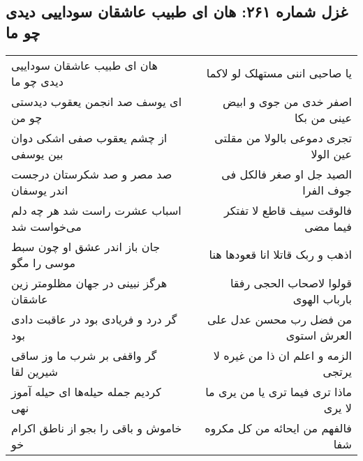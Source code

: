 \begin{center}
\section*{غزل شماره ۲۶۱: هان ای طبیب عاشقان سوداییی دیدی چو ما}
\label{sec:0261}
\begin{longtable}{l p{0.5cm} r}
هان ای طبیب عاشقان سوداییی دیدی چو ما
&&
یا صاحبی اننی مستهلک لو لاکما
\\
ای یوسف صد انجمن یعقوب دیدستی چو من
&&
اصفر خدی من جوی و ابیض عینی من بکا
\\
از چشم یعقوب صفی اشکی دوان بین یوسفی
&&
تجری دموعی بالولا من مقلتی عین الولا
\\
صد مصر و صد شکرستان درجست اندر یوسفان
&&
الصید جل او صغر فالکل فی جوف الفرا
\\
اسباب عشرت راست شد هر چه دلم می‌خواست شد
&&
فالوقت سیف قاطع لا تفتکر فیما مضی
\\
جان باز اندر عشق او چون سبط موسی را مگو
&&
اذهب و ربک قاتلا انا قعودها هنا
\\
هرگز نبینی در جهان مظلومتر زین عاشقان
&&
قولوا لاصحاب الحجی رفقا بارباب الهوی
\\
گر درد و فریادی بود در عاقبت دادی بود
&&
من فضل رب محسن عدل علی العرش استوی
\\
گر واقفی بر شرب ما وز ساقی شیرین لقا
&&
الزمه و اعلم ان ذا من غیره لا یرتجی
\\
کردیم جمله حیله‌ها ای حیله آموز نهی
&&
ماذا تری فیما تری یا من یری ما لا یری
\\
خاموش و باقی را بجو از ناطق اکرام خو
&&
فالفهم من ایحائه من کل مکروه شفا
\\
\end{longtable}
\end{center}
